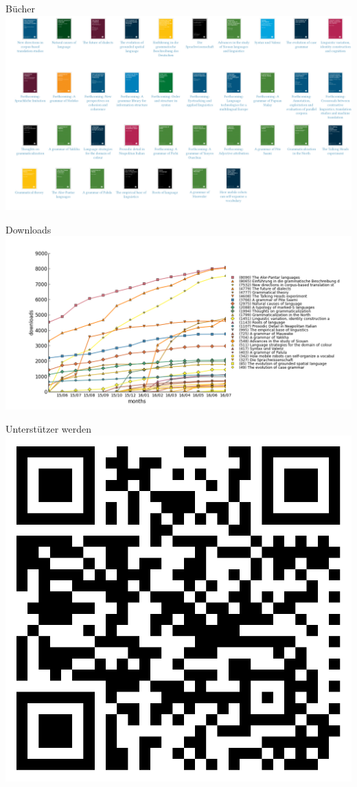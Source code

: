 \documentclass[final,utf8]{beamer}
\begin{document}
\begin{frame}{}
\begin{columns}[t]
\begin{column}{.45\linewidth}
    \begin{block}{B\"{u}cher}
      \includegraphics[width=.9\textwidth]{books.png}
    \end{block}  
  

    
    \begin{block}{Downloads}
      \includegraphics[width=.9\textwidth]{cumulativeall.png}
    \end{block}  
  

    \begin{block}{Unterst\"utzer werden}
     \raggedleft \includegraphics[width=.2\textwidth]{qrcode.png}
    \end{block}  
  


  \end{column}
\end{columns}
\vfill
\end{frame}
\end{document}
